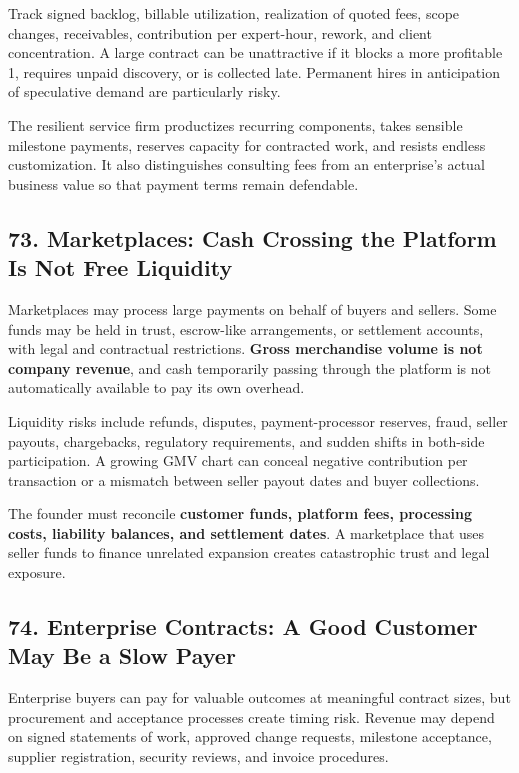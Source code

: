 Track signed backlog, billable utilization, realization of quoted fees, scope changes, receivables, contribution per expert-hour, rework, and client concentration. A large contract can be unattractive if it blocks a more profitable 1, requires unpaid discovery, or is collected late. Permanent hires in anticipation of speculative demand are particularly risky.

The resilient service firm productizes recurring components, takes sensible milestone payments, reserves capacity for contracted work, and resists endless customization. It also distinguishes consulting fees from an enterprise's actual business value so that payment terms remain defendable.

\subsection*{73. Marketplaces: Cash Crossing the Platform Is Not Free Liquidity}

Marketplaces may process large payments on behalf of buyers and sellers. Some funds may be held in trust, escrow-like arrangements, or settlement accounts, with legal and contractual restrictions. \textbf{Gross merchandise volume is not company revenue}, and cash temporarily passing through the platform is not automatically available to pay its own overhead.

Liquidity risks include refunds, disputes, payment-processor reserves, fraud, seller payouts, chargebacks, regulatory requirements, and sudden shifts in both-side participation. A growing GMV chart can conceal negative contribution per transaction or a mismatch between seller payout dates and buyer collections.

The founder must reconcile \textbf{customer funds, platform fees, processing costs, liability balances, and settlement dates}. A marketplace that uses seller funds to finance unrelated expansion creates catastrophic trust and legal exposure.

\subsection*{74. Enterprise Contracts: A Good Customer May Be a Slow Payer}

Enterprise buyers can pay for valuable outcomes at meaningful contract sizes, but procurement and acceptance processes create timing risk. Revenue may depend on signed statements of work, approved change requests, milestone acceptance, supplier registration, security reviews, and invoice procedures.


